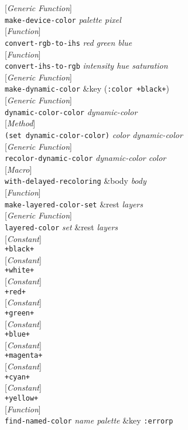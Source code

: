\documentclass[10pt]{book}
\newenvironment{defother}[2]{[\textit{#1}]\\\texttt{#2}}{\\}
\newenvironment{defun}[1]{\begin{defother}{Function}{#1}}{\end{defother}}
\newenvironment{defgeneric}[1]{\begin{defother}{Generic Function}{#1}}{\end{defother}}
\newenvironment{defmethod}[1]{\begin{defother}{Method}{#1}}{\end{defother}}
\newenvironment{defmacro}[1]{\begin{defother}{Macro}{#1}}{\end{defother}}
\newenvironment{defconstant}[1]{\begin{defother}{Constant}{#1}}{\end{defother}}
\begin{document}
\begin{defgeneric}{make-device-color} \textit{palette pixel}\end{defgeneric}
\begin{defun}{convert-rgb-to-ihs} \textit{red green blue}\end{defun}
\begin{defun}{convert-ihs-to-rgb} \textit{intensity hue saturation}\end{defun}
\begin{defgeneric}{make-dynamic-color} \&key (\texttt{:color +black+})\end{defgeneric}
\begin{defgeneric}{dynamic-color-color} \textit{dynamic-color}\end{defgeneric}
\begin{defmethod}{(set dynamic-color-color)} \textit{color dynamic-color}\end{defmethod}
\begin{defgeneric}{recolor-dynamic-color} \textit{dynamic-color color}\end{defgeneric}
\begin{defmacro}{with-delayed-recoloring} \&body \textit{body}\end{defmacro}
\begin{defun}{make-layered-color-set} \&rest \textit{layers}\end{defun}
\begin{defgeneric}{layered-color} \textit{set} \&rest \textit{layers}\end{defgeneric}
\begin{defconstant}{+black+}\end{defconstant}
\begin{defconstant}{+white+}\end{defconstant}
\begin{defconstant}{+red+}\end{defconstant}
\begin{defconstant}{+green+}\end{defconstant}
\begin{defconstant}{+blue+}\end{defconstant}
\begin{defconstant}{+magenta+}\end{defconstant}
\begin{defconstant}{+cyan+}\end{defconstant}
\begin{defconstant}{+yellow+}\end{defconstant}
\begin{defun}{find-named-color} \textit{name palette} \&key \texttt{:errorp}\end{defun}
\end{document}
